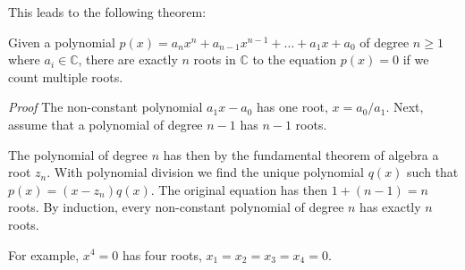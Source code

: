 \documentclass[12pt]{article}
\begin{document}
This leads to the following theorem:

Given a polynomial $p(x)=a_nx^n+a_{n-1}x^{n-1}+\ldots+a_1x+a_0 $ of degree $n\geq 1$ where $a_i\in \mathbb{C}$, there are exactly $n$ roots in $\mathbb{C}$ to the equation $p(x)=0$ if we count multiple roots.

\emph{Proof}
The non-constant polynomial $a_1x-a_0$ has one root, $x=a_0/a_1$.
Next, assume that a polynomial of degree $n-1$ has $n-1$ roots.

The polynomial of degree $n$ has then by the fundamental theorem of algebra a root $z_n$. With polynomial division we find the unique polynomial $q(x)$ such that $p(x)=(x-z_n)q(x)$. The original equation has then $1 + (n-1)=n $ roots.
By induction, every non-constant polynomial of degree $n$ has exactly $n$ roots.

For example, $x^4=0$ has four roots, $x_1=x_2=x_3=x_4=0$.
\end{document}
